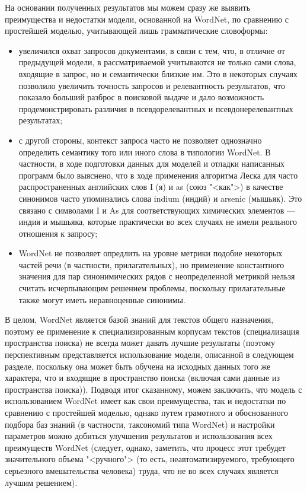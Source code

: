 На основании полученных результатов мы можем сразу же выявить преимущества и недостатки модели,
основанной на WordNet, по сравнению с простейшей моделью, учитывающей лишь грамматические словоформы:
\begin{itemize}
    \item увеличился охват запросов документами, в связи с тем, что, в отличие от предыдущей модели, в рассматриваемой
          учитываются не только сами слова, входящие в запрос, но и семантически близкие им. Это в некоторых случаях позволило
          увеличить точность запросов и релевантность результатов, что показало больший разброс в поисковой выдаче и дало
          возможность продемонстрировать различия в псевдорелевантных и псевдонерелевантных результатах;
    \item с другой стороны, контекст запроса часто не позволяет однозначно определить семантику того или иного слова 
          в типологии WordNet. В частности, в ходе подготовки данных для моделей и отладки написанных программ было
          выяснено, что в ходе применения алгоритма Леска для часто распространенных английских слов I (я) и as (союз "<как">)
          в качестве синонимов часто упоминались слова indium (индий) и arsenic (мышьяк). Это связано с символами I и As для
          соответствующих химических элементов --- индия и мышьяка, которые практически во всех случаях не имели реального
          отношения к запросу;
    \item WordNet не позволяет опредлить на уровне метрики подобие некоторых частей речи (в частности, прилагательных), но применение
          константного значения для пар синонимических рядов с неопределенной метрикой нельзя считать исчерпывающим решением проблемы,
          поскольку прилагательные также могут иметь неравноценные синонимы.
\end{itemize}
В целом, WordNet является базой знаний для текстов общего назначения, поэтому ее применение к специализированным корпусам текстов 
(специализация пространства поиска) не всегда может давать лучшие результаты (поэтому перспективным представляется использование модели,
описанной в следующем разделе, поскольку она может быть обучена на исходных данных того же характера, что и входящие в пространство поиска 
(включая сами данные из пространства поиска)). Подводя итог сказанному, можем заключить, что модель с использованием WordNet имеет как
свои преимущества, так и недостатки по сравнению с простейшей моделью, однако путем грамотного и обоснованного подбора баз знаний (в частности,
таксономий типа WordNet) и настройки параметров можно добиться улучшения результатов и использования всех преимуществ WordNet (следует, однако,
заметить, что процесс этот требудет значительного объема "<ручного"> (то есть, неавтоматизируемого, требующего серьезного вмешательства человека) труда,
что не во всех случаях является лучшим решением).